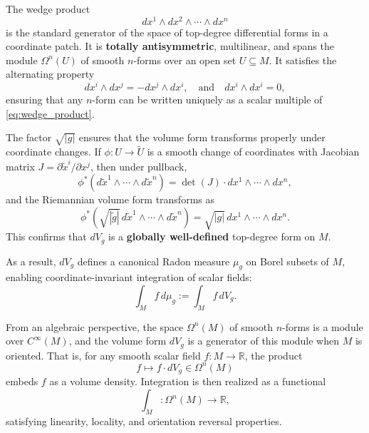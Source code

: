 The wedge product
\begin{equation}
\label{eq:wedge_product}
dx^1 \wedge dx^2 \wedge \cdots \wedge dx^n
\end{equation}
is the standard generator of the space of top-degree differential forms in a coordinate patch. It is \textbf{totally antisymmetric}, multilinear, and spans the module $\Omega^n(U)$ of smooth $n$-forms over an open set $U \subseteq M$. It satisfies the alternating property
\begin{equation}
\label{eq:alternating}
dx^i \wedge dx^j = -dx^j \wedge dx^i, \quad \text{and} \quad dx^i \wedge dx^i = 0,
\end{equation}
ensuring that any $n$-form can be written uniquely as a scalar multiple of \eqref{eq:wedge_product}.

The factor $\sqrt{|g|}$ ensures that the volume form transforms properly under coordinate changes. If $\phi : U \to \tilde{U}$ is a smooth change of coordinates with Jacobian matrix $J = \partial \tilde{x}^i / \partial x^j$, then under pullback,
\begin{equation}
\label{eq:pullback_wedge}
\phi^*\left(d\tilde{x}^1 \wedge \cdots \wedge d\tilde{x}^n\right) = \det(J) \cdot dx^1 \wedge \cdots \wedge dx^n,
\end{equation}
and the Riemannian volume form transforms as
\begin{equation}
\label{eq:volume_change}
\phi^*\left( \sqrt{|\tilde{g}|} \, d\tilde{x}^1 \wedge \cdots \wedge d\tilde{x}^n \right) = \sqrt{|g|} \, dx^1 \wedge \cdots \wedge dx^n.
\end{equation}
This confirms that $dV_g$ is a \textbf{globally well-defined} top-degree form on $M$.

As a result, $dV_g$ defines a canonical Radon measure $\mu_g$ on Borel subsets of $M$, enabling coordinate-invariant integration of scalar fields:
\begin{equation}
\label{eq:volume_integral}
\int_M f \, d\mu_g := \int_M f \, dV_g.
\end{equation}

From an algebraic perspective, the space $\Omega^n(M)$ of smooth $n$-forms is a module over $C^\infty(M)$, and the volume form $dV_g$ is a generator of this module when $M$ is oriented. That is, for any smooth scalar field $f : M \to \mathbb{R}$, the product
\begin{equation}
\label{eq:form_embedding}
f \mapsto f \cdot dV_g \in \Omega^n(M)
\end{equation}
embeds $f$ as a volume density. Integration is then realized as a functional
\begin{equation}
\label{eq:integration_functional}
\int_M : \Omega^n(M) \to \mathbb{R},
\end{equation}
satisfying linearity, locality, and orientation reversal properties.

